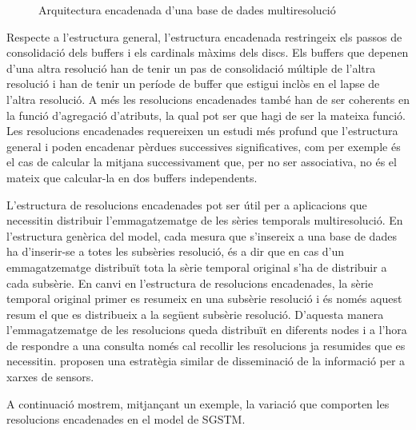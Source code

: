 \begin{figure}[tp]
  \centering
  
  \caption{Arquitectura encadenada d'una base de dades multiresolució}
  \label{fig:sgstm:encadenats}
\end{figure}


Respecte a l'estructura general, l'estructura encadenada restringeix
els passos de consolidació dels buffers i els cardinals màxims dels
discs. Els buffers que depenen d'una altra resolució han de tenir un
pas de consolidació múltiple de l'altra resolució i han de tenir un
període de buffer que estigui inclòs en el lapse de l'altra resolució.
A més les resolucions encadenades també han de ser coherents en la
funció d'agregació d'atributs, la qual pot ser que hagi de ser la
mateixa funció. Les resolucions encadenades requereixen un estudi més
profund que l'estructura general i poden encadenar pèrdues successives
significatives, com per exemple és el cas de calcular la mitjana
successivament que, per no ser associativa, no és el mateix que
calcular-la en dos buffers independents.


L'estructura de resolucions encadenades pot ser útil per a aplicacions
que necessitin distribuir l'emmagatzematge de les sèries temporals
multiresolució.  En l'estructura genèrica del model, cada mesura que
s'insereix a una base de dades ha d'inserir-se a totes les subsèries
resolució, és a dir que en cas d'un emmagatzematge distribuït tota la
sèrie temporal original s'ha de distribuir a cada subsèrie.  En canvi
en l'estructura de resolucions encadenades, la sèrie temporal original
primer es resumeix en una subsèrie resolució i és només aquest resum
el que es distribueix a la següent subsèrie resolució.  D'aquesta
manera l'emmagatzematge de les resolucions queda distribuït en
diferents nodes i a l'hora de respondre a una consulta només cal
recollir les resolucions ja resumides que es necessitin.
\textcite{deligiannakis07} proposen una estratègia similar de
disseminació de la informació per a xarxes de sensors.





A continuació mostrem, mitjançant un exemple, la variació que comporten
les resolucions encadenades en el model de \gls{SGSTM}.


